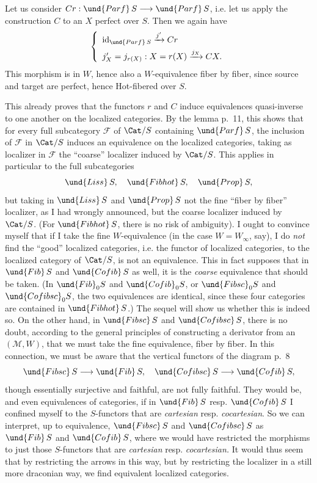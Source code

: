 Let us consider $Cr : \und{Parf}\,S \longrightarrow \und{Parf}\,S$, i.e. let us apply the construction $C$ to an $X$ perfect over $S$. Then we again have
\[
\left\{
\begin{array}{l}
\mathrm{id}_{\und{Parf}\,S} \xrightarrow{j'} Cr \\[1ex]
j'_X = j_{r(X)} : X = r(X) \xrightarrow{j_X} CX.
\end{array}
\right.
\]
This morphism is in $W$, hence also a $W$-equivalence fiber by fiber, since source and target are perfect, hence Hot-fibered over $S$.

This already proves that the functors $r$ and $C$ induce equivalences quasi-inverse to one another on the localized categories. By the lemma p.~11, this shows that for every full subcategory $\mathcal{F}$ of $\Cat/S$ containing $\und{Parf}\,S$, the inclusion of $\mathcal{F}$ in $\Cat/S$ induces an
equivalence on the localized categories, taking as localizer in $\mathcal{F}$ the ``coarse'' localizer induced by $\Cat/S$. This applies in particular to the full subcategories
\[ \und{Liss}\,S, \quad \und{Fibhot}\,S, \quad \und{Prop}\,S, \]
but taking in $\und{Liss}\,S$ and $\und{Prop}\,S$ not the fine ``fiber by fiber'' localizer, as I had wrongly announced, but the coarse localizer induced by $\Cat/S$. (For $\und{Fibhot}\,S$, there is no risk of ambiguity). I ought to convince myself that if I take the fine $W$-equivalence (in the case $W = W_\infty$, say), I do \textit{not} find the ``good'' localized categories, i.e. the functor of localized categories, to the localized category of $\Cat/S$, is not an equivalence. This in fact supposes that in $\und{Fib}\,S$ and $\und{Cofib}\,S$ as well, it is the \textit{coarse} equivalence
that should be taken. (In $\und{Fib}_0S$ and $\und{Cofib}_0S$, or $\und{Fibsc}_0S$ and $\und{Cofibsc}_0S$, the two equivalences are identical, since these four categories are contained in $\und{Fibhot}\,S$.) The sequel will show us whether this is indeed so. On the other hand, in $\und{Fibsc}\,S$ and $\und{Cofibsc}\,S$, there is no doubt, according to the general principles of constructing a derivator from an $(\mathcal{M}, W)$, that we must take the fine equivalence, fiber by fiber. In this connection, we must be aware that the vertical functors of the diagram p.~8
\[ \und{Fibsc}\,S \longrightarrow \und{Fib}\,S, \quad \und{Cofibsc}\,S \longrightarrow \und{Cofib}\,S, \]
though essentially surjective and faithful, are not fully faithful. They would be, and even equivalences of categories, if in $\und{Fib}\,S$ resp. $\und{Cofib}\,S$ I confined myself to the $S$-functors that are \textit{cartesian} resp. \textit{cocartesian}. So we can interpret, up to equivalence, $\und{Fibsc}\,S$ and $\und{Cofibsc}\,S$ as $\und{Fib}\,S$ and $\und{Cofib}\,S$, where we would have restricted the morphisms to just those $S$-functors that are \textit{cartesian} resp. \textit{cocartesian.} It would thus seem that by restricting the arrows in this way, but by restricting the localizer in a still more draconian way, we find equivalent localized categories. %

